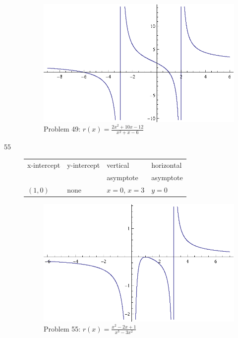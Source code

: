 \documentclass{exam}
\begin{document}
\begin{description}
      \begin{figure}[H]
        \centering
        \includegraphics[scale = 0.8]{problem49.eps}
        \caption*{ Problem 49: $r(x) = \frac{2x^2 + 10x - 12}{x^2 + x - 6}$ }
      \end{figure}

    \item[55]
      \begin{tabular}{llll}
        \toprule
        x-intercept & y-intercept & vertical         & horizontal \\
                    &             & asymptote        & asymptote \\
        \midrule
        $(1, 0)$    & none        & $x = 0$, $x = 3$ & $y = 0$ \\
        \bottomrule
      \end{tabular}

      \begin{figure}[H]
        \centering
        \includegraphics[scale = 0.8]{problem55.eps}
        \caption*{ Problem 55: $r(x) = \frac{x^2 - 2x + 1}{x^3 - 3x^2}$ }
      \end{figure}


\end{description}
\end{document}
